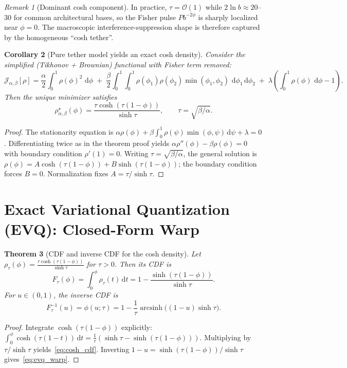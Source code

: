 \documentclass[11pt]{article}
\theoremstyle{plain}
\newtheorem{theorem}{Theorem}
\newtheorem{corollary}[theorem]{Corollary}
\theoremstyle{definition}
\theoremstyle{remark}
\newtheorem{remark}[theorem]{Remark}
\newcommand{\asinh}{\operatorname{arcsinh}}
\newcommand{\dd}{\,\mathrm{d}}
\begin{document}
\begin{remark}[Dominant cosh component]
In practice, $\tau=\mathcal{O}(1)$ while $2\ln b\approx 20$--$30$ for common
architectural bases, so the Fisher pulse $P b^{-2\phi}$ is sharply localized
near $\phi=0$. The macroscopic interference-suppression shape is therefore
captured by the homogeneous ``cosh tether''.
\end{remark}

\begin{corollary}[Pure tether model yields an exact cosh density]
Consider the simplified (Tikhonov + Brownian) functional with Fisher term removed:
\begin{equation}
\mathcal{J}_{\alpha,\beta}[\rho]=\frac{\alpha}{2}\int_0^1\rho(\phi)^2\,\dd\phi
\;+\;\frac{\beta}{2}\int_0^1\!\!\int_0^1\rho(\phi_1)\rho(\phi_2)\min(\phi_1,\phi_2)\,\dd\phi_1\dd\phi_2
\;+\;\lambda\!\left(\int_0^1\rho(\phi)\,\dd\phi-1\right).
\label{eq:J_alpha}
\end{equation}
Then the unique minimizer satisfies
\begin{equation}
\rho_{\alpha,\beta}^\star(\phi)=\frac{\tau\cosh(\tau(1-\phi))}{\sinh\tau},\qquad \tau=\sqrt{\beta/\alpha}.
\label{eq:rho_cosh_density}
\end{equation}
\end{corollary}
\begin{proof}
The stationarity equation is $\alpha\rho(\phi)+\beta\int_0^1\rho(\psi)\min(\phi,\psi)\dd\psi+\lambda=0$.
Differentiating twice as in the theorem proof yields $\alpha\rho''(\phi)-\beta\rho(\phi)=0$
with boundary condition $\rho'(1)=0$. Writing $\tau=\sqrt{\beta/\alpha}$, the general solution is
$\rho(\phi)=A\cosh(\tau(1-\phi))+B\sinh(\tau(1-\phi))$; the boundary condition forces $B=0$.
Normalization fixes $A=\tau/\sinh\tau$.
\end{proof}

\section{Exact Variational Quantization (EVQ): Closed-Form Warp}

\begin{theorem}[CDF and inverse CDF for the cosh density]
Let $\rho_\tau(\phi)=\frac{\tau\cosh(\tau(1-\phi))}{\sinh\tau}$ for $\tau>0$.
Then its CDF is
\begin{equation}
F_\tau(\phi)=\int_0^\phi\rho_\tau(t)\dd t
=1-\frac{\sinh(\tau(1-\phi))}{\sinh\tau}.
\label{eq:cosh_cdf}
\end{equation}
For $u\in(0,1)$, the inverse CDF is
\begin{equation}
F_\tau^{-1}(u)=\phi(u;\tau)=1-\frac{1}{\tau}\asinh\!\bigl((1-u)\sinh\tau\bigr).
\label{eq:evq_warp}
\end{equation}
\end{theorem}
\begin{proof}
Integrate $\cosh(\tau(1-\phi))$ explicitly:
$\int_0^\phi \cosh(\tau(1-t))\dd t
=\frac{1}{\tau}(\sinh\tau-\sinh(\tau(1-\phi)))$.
Multiplying by $\tau/\sinh\tau$ yields~\eqref{eq:cosh_cdf}. Inverting
$1-u=\sinh(\tau(1-\phi))/\sinh\tau$ gives~\eqref{eq:evq_warp}.
\end{proof}
\end{document}
